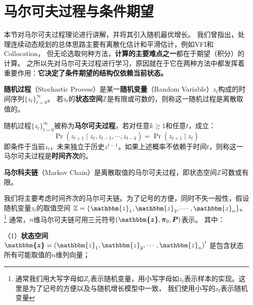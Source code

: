 
\section{马尔可夫过程与条件期望}    \label{sec-markov}

本节对马尔可夫过程理论进行讲解，并将其引入随机最优增长。
我们曾指出，处理连续动态规划的总体思路主要有离散化估计和平滑估计，例如VFI和Collocation，
但无论选取何种方法，\textbf{计算的主要难点之一}都在于期望（积分）的计算。
之所以先对马尔可夫过程进行学习，原因就在于它在两种方法中都发挥着重要作用：\textbf{它决定了条件期望的结构仅依赖当前状态。}

\begin{definition}
    \textbf{随机过程}（Stochastic Process）是某一\textbf{随机变量}（Random Variable）$z_t$构成的时间序列$\{z_t\}_{t=0}^{\infty}$。
    若$z_t$的\textbf{状态空间}$\mathbb{Z}$是有限或可数的，则称这一随机过程是离散取值的。
\end{definition}

\begin{definition}
    随机过程$\{z_t\}_{t=0}^{\infty}$被称为\textbf{马尔可夫过程}，若对任意$k\geq1$和任意$t$，成立：
    \begin{equation*}
        \operatorname{Pr}\left(z_{t+1}\mid z_t,z_{t-1},\cdots,z_{t-k}\right)=\operatorname{Pr}\left(z_{t+1}\mid z_t\right)
    \end{equation*}
    即条件于当前$z_t$，未来独立于历史$z^{t-1}$。如果上述概率不依赖于时间$t$，则称这一马尔可夫过程是\textbf{时间齐次}的。
\end{definition}

\begin{definition}
    \textbf{马尔科夫链}（Markov Chain）是离散取值的马尔可夫过程，即状态空间$\mathbb{Z}$可数或有限。
\end{definition}

我们将主要考虑时间齐次的马尔可夫链。为了记号的方便，同时不失一般性，假设随机变量$z_t$的取值空间
$\mathbb{Z}=\{\mathbbm{z}_1,\mathbbm{z}_2,\cdots,\mathbbm{z}_n\}$。
\footnote{通常我们用大写字母如$Z_t$表示随机变量，用小写字母如$z_t$表示样本的实现。这里是为了记号的方便以及与随机增长模型中一致，
我们使用小写的$z_t$表示随机变量}
通常，$n$维马尔可夫链可用三元符号$\left(\boldsymbol{\mathbbm{z}},\boldsymbol{\pi}_0, \boldsymbol{P}\right)$表示。
其中：

（1）\textbf{状态空间}$\boldsymbol{\mathbbm{z}}=\left(\mathbbm{z}_1,\mathbbm{z}_2,\cdots,\mathbbm{z}_n\right)^{\prime}$
是包含状态所有可能取值的$n$维列向量；

